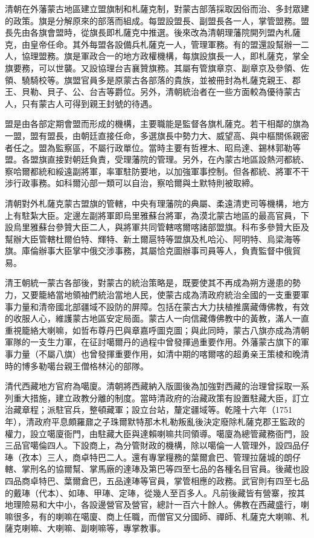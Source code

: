 清朝在外藩蒙古地區建立盟旗制和札薩克制，對蒙古部落採取因俗而治、多封眾建的政策。旗是分解原來的部落而組成。每盟設盟長、副盟長各一人，掌管盟務。盟長先由各旗會盟時，從旗長即札薩克中推選。後來改為清朝理藩院開列盟內札薩克，由皇帝任命。其外每盟各設備兵札薩克一人，管理軍務。有的盟還設幫辦一二人，協理盟務。旗是軍政合一的地方政權機構，每旗設旗長一人，即札薩克，掌全旗要務，可以世襲。又設協理台吉襄贊旗務。其屬有管旗章京、副章京及參領、佐領、驍騎校等。旗盟官員多是原蒙古各部落的貴族，並被冊封為札薩克親王、郡王、貝勒、貝子、公、台吉等爵位。另外，清朝統治者在一些方面較為優待蒙古人，只有蒙古人可得到親王封號的待遇。

盟是由各部定期會盟而形成的機構，主要職能是監督各旗札薩克。若干相鄰的旗為一盟，盟有盟長，由朝廷直接任命，多選旗長中勢力大、威望高、與中樞關係親密者任之。盟為監察區，不屬行政單位。當時主要有哲裡木、昭烏達、錫林郭勒等盟。各盟旗直接對朝廷負責，受理藩院的管理。另外，在內蒙古地區設熱河都統、察哈爾都統和綏遠副將軍，率軍駐防要地，以加強軍事控制。但各都統、將軍不干涉行政事務。如科爾沁部一類可以自治，察哈爾與土默特則被取締。

清朝對外札薩克蒙古盟旗的管轄，中央有理藩院的典屬、柔遠清吏司等機構，地方上有駐紮大臣。定邊左副將軍即烏里雅蘇台將軍，為漠北蒙古地區的最高官員，下設烏里雅蘇台參贊大臣二人，與將軍共同管轄喀爾喀諸部盟旗。科布多參贊大臣及幫辦大臣管轄杜爾伯特、輝特、新土爾扈特等盟旗及札哈沁、阿明特、烏梁海等旗。庫倫辦事大臣掌中俄交涉事務，其屬恰克圖辦事司員等人，負責監督中俄貿易。

清王朝統一蒙古各部後，對蒙古的統治策略是，既要使其不再成為朔方邊患的勢力，又要籠絡當地領袖們統治當地人民，使蒙古成為清政府統治全國的一支重要軍事力量和清帝國北部疆域不設防的屏障。包括在蒙古大力扶植推廣藏傳佛教，有效的收服人心，維護蒙古地區安定局面。蒙古人一向信藏傳佛教中的黃教，滿人一直重視籠絡大喇嘛，如哲布尊丹巴與章嘉呼圖克圖；與此同時，蒙古八旗亦成為清朝軍隊的一支生力軍，在征討噶爾丹的過程中曾發揮過重要作用。外藩蒙古旗下的軍事力量（不屬八旗）也曾發揮重要作用，如清中期的喀爾喀的超勇亲王策棱和晚清時的博多勒噶台親王僧格林沁的部隊。

清代西藏地方官府為噶廈。清朝將西藏納入版圖後為加強對西藏的治理曾採取一系列重大措施，建立政教分離的制度。當時清政府的治藏政策有設置駐藏大臣，訂立治藏章程；派駐官兵，整頓藏軍；設立台站，釐定疆域等。乾隆十六年（1751年），清政府平息頗羅鼐之子珠爾默特那木札勒叛亂後決定廢除札薩克郡王監政的權力，設立噶廈衙門，由駐藏大臣與達賴喇嘛共同領導。噶廈為總管藏務衙門，設三品官噶倫四人。下設商上，為分管財政的機構，除以噶倫一人管理外，設四品仔琫（孜本）三人，商卓特巴二人。還有專掌糧務的葉爾倉巴、管理拉薩城的朗仔轄、掌刑名的協爾幫、掌馬廠的達琫及第巴等四至七品的各種名目官員。後藏也設四品商卓特巴、葉爾倉巴，五品達琫等官員，掌管相應的政務。武官則有四至七品的戴琫（代本）、如琫、甲琫、定琫，從幾人至百多人。凡前後藏皆有營寨，按其地理險易和大中小，各設邊營官及營官，總計一百六十餘人。佛教在西藏盛行，喇嘛很多，有的喇嘛在噶廈、商上任職，而僧官又分國師、禪師、札薩克大喇嘛、札薩克喇嘛、大喇嘛、副喇嘛等，專掌教事。

